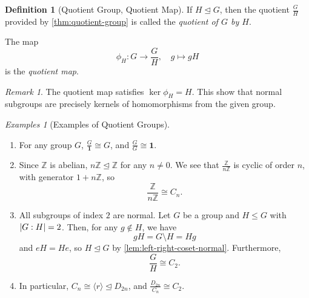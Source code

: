 \documentclass{article}
\theoremstyle{definition}
\newtheorem{definition}[theorem]{Definition}
\theoremstyle{remark}
\newtheorem{remark}[theorem]{Remark}
\DeclarePairedDelimiter{\abs}{\lvert}{\rvert}
\newcommand{\angBrac}[1]{\langle #1\rangle}
\newcommand{\flatfrac}[2]{\frac{#1}{#2}}
\newcommand{\function}[5]{#1:#2\to #3,\quad #4\mapsto #5}
\newcommand{\isomorphic}{\cong}
\newcommand{\normalsub}{\trianglelefteq}
\newcommand{\subgroup}{\leq}
\newcommand{\ZZ}{\mathbb{Z}}
\newtheorem*{examples*}{Examples}
\newcommand{\trivialgp}{\mathbf{1}}
\begin{document}
\begin{definition}[Quotient Group, Quotient Map]
    \label{def:quotient-group-map}
    If \(H \normalsub G\), then the quotient \(\flatfrac{G}{H}\) provided by \autoref{thm:quotient-group} is called the \emph{quotient of \(G\) by \(H\)}.
    
    The map
    \[
        \function{\phi_{H}}{G}{\flatfrac{G}{H}}{g}{gH}
    \]
    is the \emph{quotient map}.
\end{definition}

\begin{remark}
    The quotient map satisfies \(\ker \phi_{H} = H\). This show that normal subgroups are precisely kernels of homomorphisms from the given group.
\end{remark}

\begin{examples*}[Examples of Quotient Groups]
    \begin{enumerate}
        \item For any group \(G\), \(\flatfrac{G}{\trivialgp} \isomorphic G\), and \(\flatfrac{G}{G} \isomorphic \trivialgp\).
        \item Since \(\ZZ\) is abelian, \(n\ZZ \normalsub \ZZ\) for any \(n \neq 0\). We see that \(\flatfrac{\ZZ}{n \ZZ}\) is cyclic of order \(n\), with generator \(1 + n\ZZ\), so
        \[
            \flatfrac{\ZZ}{n\ZZ} \isomorphic C_n.
        \]
        \item All subgroups of index \(2\) are normal. Let \(G\) be a group and \(H \subgroup G\) with \(\abs{G : H} = 2\). Then, for any \(g \notin H\), we have
        \[
            gH = G \setminus H = Hg
        \]
        and \(eH = He\), so \(H \normalsub G\) by \autoref{lem:left-right-coset-normal}. Furthermore,
        \[
            \flatfrac{G}{H} \isomorphic C_2.
        \]
        \item In particular, \(C_n \isomorphic \angBrac{r} \normalsub D_{2n}\), and \(\flatfrac{D_{2n}}{C_n} \isomorphic C_2\).
    \end{enumerate}
\end{examples*}
\end{document}
